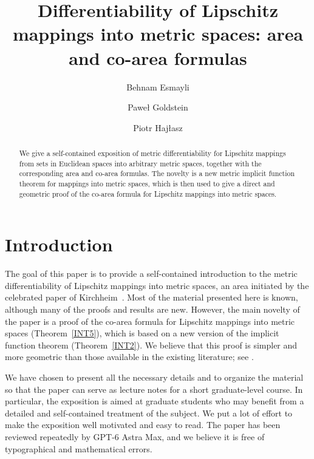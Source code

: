 \documentclass[12pt,leqno]{amsart}
\title[Lipschitz mappings into metric spaces]{Differentiability of Lipschitz mappings into metric spaces: area and co-area formulas}
\author[B. Esmayli]{Behnam Esmayli}
\author[P. Goldstein]{Pawe\l{}  Goldstein}
\author[P. Haj\l{}asz]{Piotr Haj\l{}asz}
\theoremstyle{definition}
\numberwithin{theorem}{section} \numberwithin{equation}{section}
\begin{document}
\sloppy




\begin{abstract}
We give a self-contained exposition of metric differentiability for Lipschitz mappings from sets in Euclidean spaces into arbitrary metric spaces, together with the corresponding area and co-area formulas. The novelty is a new metric implicit function theorem for mappings into metric spaces, which is then used to give a direct and geometric proof of the co-area formula for Lipschitz mappings into metric spaces.
\end{abstract}



\maketitle




\section{Introduction}
The goal of this paper is to provide a self-contained introduction to the metric differentiability of Lipschitz mappings into metric spaces, an area initiated by the celebrated paper of Kirchheim~\cite{kir}. Most of the material presented here is known, although many of the proofs and results are new. However, the main novelty of the paper is a proof of the co-area formula for Lipschitz mappings into metric spaces (Theorem~\ref{INT5}), which is based on a new version of the implicit function theorem (Theorem~\ref{INT2}). We believe that this proof is simpler and more geometric than those available in the existing literature; see \cite{kar,reichel}.

We have chosen to present all the necessary details and to organize the material so that the paper can serve as lecture notes for a short graduate-level course. In particular, the exposition is aimed at graduate students who may benefit from a detailed and self-contained treatment of the subject. We put a lot of effort to make the exposition well motivated and easy to read. The paper has been reviewed repeatedly by GPT-6 Astra Max, and we believe it is free of typographical and mathematical errors.
\end{document}
